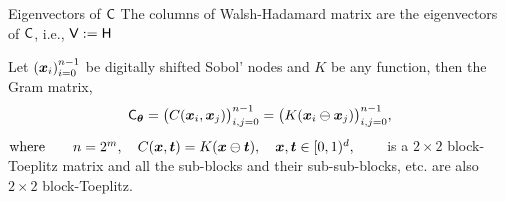 \documentclass[handout, 10pt,compress,xcolor={usenames,dvipsnames}]{beamer} %
\newcommand{\bm}[1]{\boldsymbol{#1}}
\newcommand{\mCtheta}{\mC_{\vtheta}}
\renewcommand{\vtheta}{{\bm{\theta}}}
\begin{document}
\begin{frame}{Eigenvectors of $\mathsf{C}$}
	\vspace{-2ex}
	The columns of Walsh-Hadamard matrix are the eigenvectors of $\mathsf{C}$, i.e., $\mathsf{V} := \mathsf{H}$
	\begin{theorem}
		\label{thrm:block-toeplitz}
		Let $\left(\boldsymbol{x}_i\right)_{i=0}^{n-1}$ be digitally shifted Sobol' nodes and $K$ be any function,
		then the Gram matrix,
		\vspace{-1ex}
		$$
		\mCtheta = \bigl(C(\vx_i, \vx_j)\bigr)_{i,j=0}^{n-1} = \bigl(K(\vx_i \ominus \vx_j)\bigr)_{i,j=0}^{n-1},
		$$   
		$\text{where} \quad \quad n=2^m, \quad C(\boldsymbol{x}, \boldsymbol{t}) = K(\boldsymbol{x} \ominus \boldsymbol{t}), \quad  \boldsymbol{x}, \boldsymbol{t} \in [0,1)^d, \qquad
		$
		is a $2\times 2$ block-Toeplitz matrix and all the sub-blocks and their sub-sub-blocks, etc. are also $2\times 2$ block-Toeplitz. 
	\end{theorem}
	
	
\end{frame}
\end{document}

